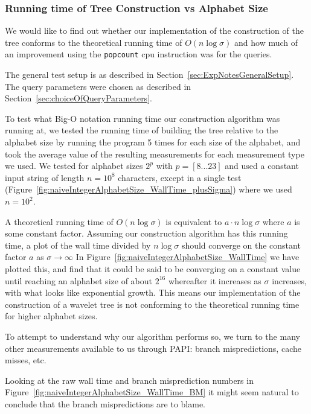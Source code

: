\subsubsection{Running time of Tree Construction vs Alphabet Size}

We would like to find out whether our implementation of the construction of the tree conforms to the theoretical running time of $O(n \log \sigma)$ and how much of an improvement using the \texttt{popcount} cpu instruction was for the queries.

The general test setup is as described in Section~\ref{sec:ExpNotesGeneralSetup}.
The query parameters were chosen as described in Section~\ref{sec:choiceOfQueryParameters}.

To test what Big-O notation running time our construction algorithm was running at, we tested the running time of building the tree relative to the alphabet size by running the program 5 times for each size of the alphabet, and took the average value of the resulting measurements for each measurement type we used.
We tested for alphabet sizes $2^p$ with $p = [8...23]$ and used a constant input string of length $n = 10^8$ characters, except in a single test (Figure~\ref{fig:naiveIntegerAlphabetSize_WallTime_plusSigma}) where we used $n = 10^2$.

A theoretical running time of $O(n \log\sigma)$ is equivalent to $a \cdot n \log\sigma$ where $a$ is some constant factor.
Assuming our construction algorithm has this running time, a plot of the wall time divided by $n \log\sigma$ should converge on the constant factor $a$ as $\sigma \rightarrow \infty$
In Figure~\ref{fig:naiveIntegerAlphabetSize_WallTime} we have plotted this, and find that it could be said to be converging on a constant value until reaching an alphabet size of about $2^{16}$ whereafter it increases as $\sigma$ increases, with what looks like exponential growth.
This means our implementation of the construction of a wavelet tree is not conforming to the theoretical running time for higher alphabet sizes.



To attempt to understand why our algorithm performs so, we turn to the many other measurements available to us through PAPI: branch mispredictions, cache misses, etc.

Looking at the raw wall time and branch misprediction numbers in Figure~\ref{fig:naiveIntegerAlphabetSize_WallTime_BM} it might seem natural to conclude that the branch mispredictions are to blame.

